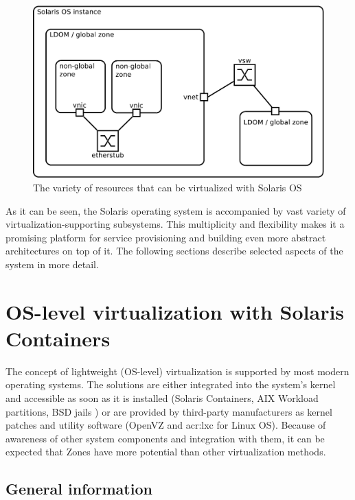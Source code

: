 \documentclass[11pt]{book}
\begin{document}
      \begin{figure}[H]
        \begin{center}
          \includegraphics[width=.7\textwidth]{img/solaris/full-featured.pdf}
        \end{center}

        \caption{The variety of resources that can be virtualized with Solaris OS}
      \end{figure}

      As it can be seen, the Solaris operating system is accompanied by vast variety of virtualization-supporting
      subsystems. This multiplicity and flexibility makes it a promising platform for service provisioning and building
      even more abstract architectures on top of it. The following sections describe selected aspects of the system in
      more detail.


    \section{OS-level virtualization with Solaris Containers}
    \label{sec:sol:containers}


      The concept of lightweight (OS-level) virtualization is supported by most modern operating systems. The solutions
      are either integrated into the system's kernel and accessible as soon as it is installed (Solaris Containers, AIX
      Workload partitions, BSD jails \cite{kamp}) or are provided by third-party manufacturers as kernel patches and
      utility software (OpenVZ and \gls{acr:lxc} for Linux OS). Because of awareness of other system components and
      integration with them, it can be expected that Zones have more potential than other virtualization methods.


      \subsection{General information}
      \label{sub:}
\end{document}
